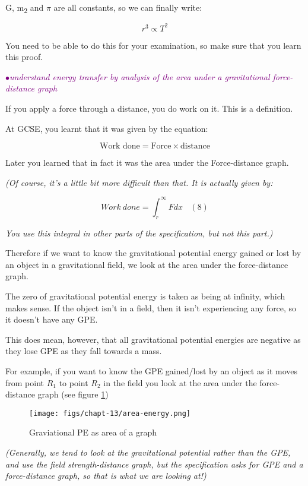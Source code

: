 \documentclass[a4paper,11pt,twoside]{memoir}
\newcounter{spec}[chapter]
\newcommand{\spec}[1]{\Needspace{5\baselineskip}\textcolor{purple}{$\bullet$\hspace{0.5cm}\textit{#1}}}
\begin{document}
G, m\textsubscript{2} and $\pi$ are all constants, so we can finally write:

\[r^{3} \propto T^{2}\]

You need to be able to do this for your examination, so make sure that
you learn this proof.

\spec{understand energy transfer by analysis of the area under a gravitational force-distance graph}

If you apply a force through a distance, you do work on it. This is a definition.

At GCSE, you learnt that it was given by the equation:

$$\text{Work done} = \text{Force} \times \text{distance}$$

Later you learned that in fact it was the area under the Force-distance
graph.

\emph{(Of course, it's a little bit more difficult than that. It is
actually given by:}

\[Work\ done = \int_{r}^{\infty}{F{dx\ \ \ \ (8)}}\]

\emph{You use this integral in other parts of the specification, but not
this part.)}

Therefore if we want to know the gravitational potential energy gained
or lost by an object in a gravitational field, we look at the area under
the force-distance graph.

The zero of gravitational potential energy is taken as being at
infinity, which makes sense. If the object isn't in a field, then it
isn't experiencing any force, so it doesn't have any GPE.

This does mean, however, that all gravitational potential energies are
negative as they lose GPE as they fall towards a mass.

For example, if you want to know the GPE gained/lost by an object as it
moves from point $R_1$ to point $R_2$ in the field you look at the area under
the force-distance graph (see figure \ref{gpe-area})

\begin{figure}
  \begin{center}
  \texttt{[image: figs/chapt-13/area-energy.png]}
\end{center}
  \caption{Graviational PE as area of a graph}
  \label{gpe-area}
\end{figure}


\emph{(Generally, we tend to look at the gravitational potential rather
than the GPE, and use the field strength-distance graph, but the
specification asks for GPE and a force-distance graph, so that is what
we are looking at!)}
\end{document}
